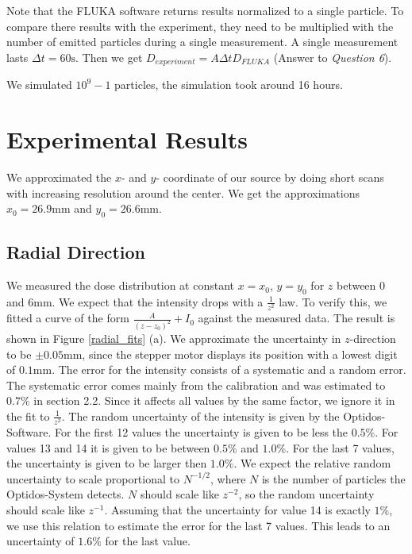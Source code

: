 \documentclass[a4paper,parskip]{scrartcl}
\begin{document}



Note that the FLUKA software returns results normalized to a single particle. To compare there results with the experiment, they need to be multiplied with the number of emitted particles during a single measurement. A single measurement lasts $\Delta t = 60 \mathrm{s}$. Then we get $D_{experiment} = A\Delta t D_{FLUKA}$ (Answer to \textit{Question 6}).

We simulated $10^9-1$ particles, the simulation took around 16 hours.


\section{Experimental Results}

We approximated the $x$- and $y$- coordinate of our source by doing short scans with increasing resolution around the center. We get the approximations $x_0 = 26.9 \mathrm{mm}$ and $y_0 = 26.6 \mathrm{mm}$.

\subsection{Radial Direction}


We measured the dose distribution at constant $x=x_0$, $y=y_0$ for $z$ between 0 and 6mm. We expect that the intensity drops with a $\frac{1}{z^ 2}$ law. To verify this, we fitted a curve of the form $\frac{A}{(z-z_0)^ 2}+I_0$ against the measured data. The result is shown in Figure \ref{radial_fits} (a). We approximate the uncertainty in $z$-direction to be $\pm 0.05 \mathrm{mm}$, since the stepper motor displays its position with a lowest digit of $0.1\mathrm{mm}$. The error for the intensity consists of a systematic and a random error. The systematic error comes mainly from the calibration and was estimated to $0.7\%$ in section 2.2. Since it affects all values by the same factor, we ignore it in the fit to $\frac{1}{z^2}$. The random uncertainty of the intensity is given by the Optidos-Software. For the first 12 values the uncertainty is given to be less the $0.5\%$. For values 13 and 14 it is given to be between $0.5\%$ and $1.0\%$. For the last 7 values, the uncertainty is given to be larger then $1.0\%$. We expect the relative random uncertainty to scale proportional to $N^ {-1/2}$, where $N$ is the number of particles the Optidos-System detects. $N$ should scale like $z^ {-2}$, so the random uncertainty should scale like $z^ {-1}$. Assuming that the uncertainty for value 14 is exactly $1\%$, we use this relation to estimate the error for the last 7 values. This leads to an uncertainty of $1.6\%$ for the last value.
\end{document}

